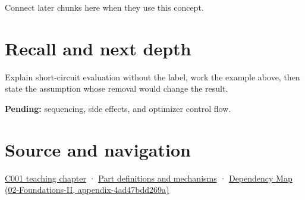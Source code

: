 Connect later chunks here when they use this concept.

\section{Recall and next depth}\label{appendix-2e245a6fa8d3-recall-and-next-depth}

Explain short-circuit evaluation without the label, work the example above, then state the assumption whose removal would change the result.

\textbf{Pending:} sequencing, side effects, and optimizer control flow.

\section{Source and navigation}\label{appendix-2e245a6fa8d3-source-and-navigation}

\href{Continuous\%20Notes/Computing\%20Foundations\%20-\%20From\%20Bits\%20to\%20C++\%20and\%20Systems\%20APIs\#From\%20a\%20signal\%20to\%20an\%20interpretation}{C001 teaching chapter} · \hyperref[appendix-fd090d982a15]{Part definitions and mechanisms} · \href{../02-Foundations-II/main.pdf\#nameddest=appendix-4ad47bdd269a}{Dependency Map (02-Foundations-II, appendix-4ad47bdd269a)}
